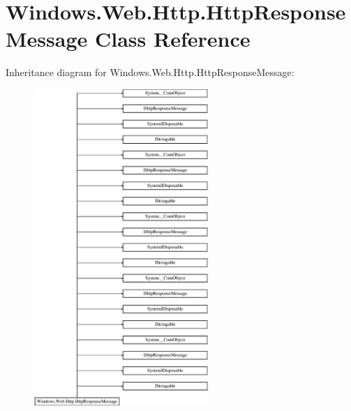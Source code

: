 \hypertarget{class_windows_1_1_web_1_1_http_1_1_http_response_message}{}\section{Windows.\+Web.\+Http.\+Http\+Response\+Message Class Reference}
\label{class_windows_1_1_web_1_1_http_1_1_http_response_message}
Inheritance diagram for Windows.\+Web.\+Http.\+Http\+Response\+Message\+:\begin{figure}[H]
\begin{center}
\leavevmode
\includegraphics[height=12.000000cm]{class_windows_1_1_web_1_1_http_1_1_http_response_message}
\end{center}
\end{figure}
